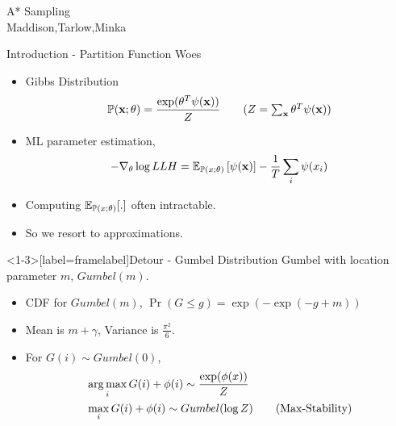 \begin{frame}
  \begin{center}
    {\huge A* Sampling
    } \\
    Maddison,Tarlow,Minka
  \end{center}
\end{frame}

\begin{frame}{Introduction - Partition Function Woes}
  \begin{itemize}
  \item Gibbs Distribution
    \begin{align*}
      \Pr(\x;\theta) =\frac{\exp(\theta^T\psi(\x))}{Z} \tag{$Z=\sum_{\x} \theta^T\psi(\x)$}
    \end{align*}
  \item ML parameter estimation,
    \begin{align*}
      - \nabla_\theta \log LLH = \operatorname{\mathbb{E}}_{\mathbb{P}(x;\theta)}\left[\psi(\operatorname{\mathbf{x}})\right] - \frac{1}{T} \sum_i\psi(x_i)
    \end{align*}
  \item   Computing $\operatorname{\mathbb{E}}_{\mathbb{P}(x;\theta)}[.]$ often intractable.
  \item So we resort to approximations. %
  \end{itemize}
\end{frame}

\begin{frame}<1-3>[label=framelabel]{Detour - Gumbel Distribution}
  Gumbel with location parameter $m$, $Gumbel(m)$.
  \begin{itemize}
  \item CDF for $Gumbel(m)$, $\Pr(G\le g) = \exp(-\exp(-g+m))$ \\
    \pause
  \item Mean is $m+\gamma$, Variance is $\frac{\pi^2}{6}$.
    \pause
  \item\alert<4->{For $G(i) \sim Gumbel(0)$,
    \begin{align*}
      & \operatorname*{{arg\,max}}_i{G(i)+\phi(i)} \sim \frac{\exp(\phi(x))}{Z} \\
      & \max_i{G(i)+\phi(i)} \sim Gumbel(\log Z) \tag{Max-Stability}
    \end{align*}
  }
  \end{itemize}
\end{frame}

